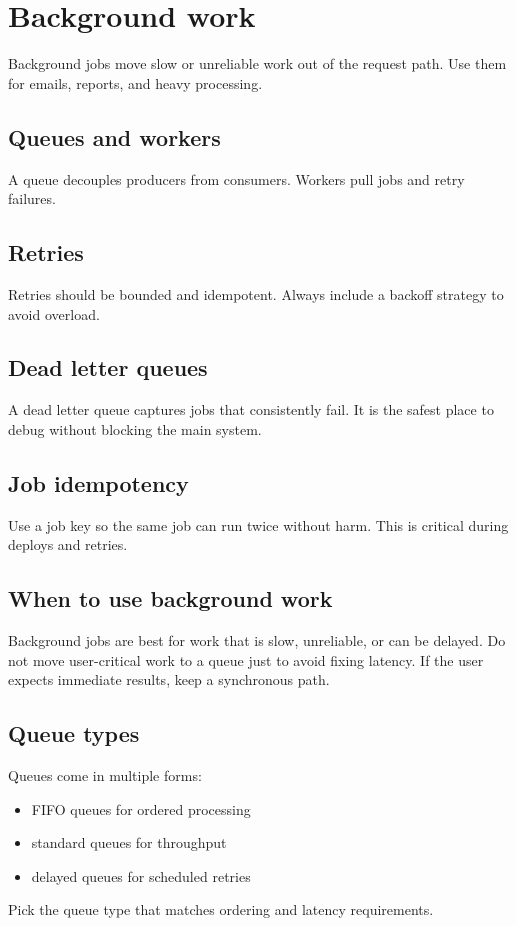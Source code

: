 \chapter{Background work}

Background jobs move slow or unreliable work out of the request path.
Use them for emails, reports, and heavy processing.

\section{Queues and workers}
A queue decouples producers from consumers.
Workers pull jobs and retry failures.

\section{Retries}
Retries should be bounded and idempotent.
Always include a backoff strategy to avoid overload.

\section{Dead letter queues}
A dead letter queue captures jobs that consistently fail.
It is the safest place to debug without blocking the main system.

\section{Job idempotency}
Use a job key so the same job can run twice without harm.
This is critical during deploys and retries.

\section{When to use background work}
Background jobs are best for work that is slow, unreliable, or can be delayed.
Do not move user-critical work to a queue just to avoid fixing latency.
If the user expects immediate results, keep a synchronous path.

\section{Queue types}
Queues come in multiple forms:
\begin{itemize}[nosep]
  \item FIFO queues for ordered processing
  \item standard queues for throughput
  \item delayed queues for scheduled retries
\end{itemize}
Pick the queue type that matches ordering and latency requirements.

